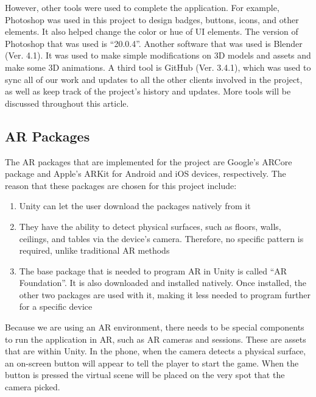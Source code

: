 However, other tools were used to complete the application. For example, Photoshop was used in this project to design badges, buttons, icons, and other  elements. It also helped change the color or hue of \acrshort{UI} elements. The version of Photoshop that was used is “20.0.4”. Another software that was used is Blender (Ver. 4.1). It was used to make simple modifications on 3D models and assets and make some 3D animations. A third tool is GitHub (Ver. 3.4.1), which was used to sync all of our work and updates to all the other clients involved in the project, as well as keep track of the project's history and updates. More tools will be discussed throughout this article.

\subsection{\acrshort{AR} Packages}
\label{ARPackageSec}
The \acrshort{AR} packages that are implemented for the project are Google’s ARCore package and Apple's ARKit for Android and iOS devices, respectively. The reason that these packages are chosen for this project include:
\begin{enumerate}
    
    \item{Unity can let the user download the packages natively from it}
    
    \item{They have the ability to detect physical surfaces, such as floors, walls, ceilings, and tables via the device's camera. Therefore, no specific pattern is required, unlike traditional \acrshort{AR} methods}
    
    \item{The base package that is needed to program \acrshort{AR} in Unity is called “AR Foundation”. It is also downloaded and installed natively. Once installed, the other two packages are used with it, making it less needed to program further for a specific device}

\end{enumerate}
Because we are using an \acrshort{AR} environment, there needs to be special components to run the application in \acrshort{AR}, such as \acrshort{AR} cameras and sessions. These are assets that are within Unity. In the phone, when the camera detects a physical surface, an on-screen button will appear to tell the player to start the game. When the button is pressed the virtual scene will be placed on the very spot that the camera picked.

